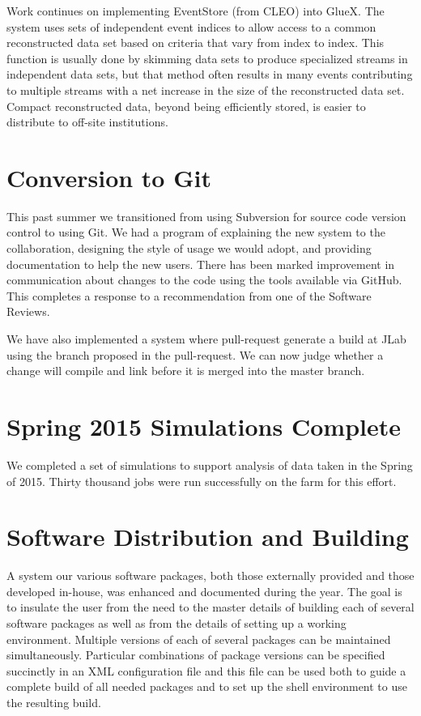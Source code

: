\documentclass[12pt]{article}
\begin{document}
Work continues on implementing EventStore (from CLEO) into GlueX.
The system uses sets of independent event indices to
allow access to a common reconstructed data set based on criteria that
vary from index to index. This function is usually done by skimming
data sets to produce specialized streams in independent data sets, but
that method often results in many events contributing to multiple
streams with a net increase in the size of the reconstructed data
set. Compact reconstructed data, beyond being efficiently stored, is
easier to distribute to off-site institutions.

\section{Conversion to Git}

This past summer we transitioned from using Subversion for source code
version control to using Git. We had a program of explaining the new
system to the collaboration, designing the style of usage we would
adopt, and providing documentation to help the new users. There has
been marked improvement in communication about changes to the code
using the tools available via GitHub\cite{gluex-github}.
This completes a response to a
recommendation from one of the Software Reviews.

We have also implemented a system where pull-request generate a build
at JLab using the branch proposed in the pull-request. We can now
judge whether a change will compile and link before it is merged into
the master branch.

\section{Spring 2015 Simulations Complete}

We completed a set of simulations to support analysis of data taken in
the Spring of 2015. Thirty thousand jobs were run successfully on the
farm for this effort.

\section{Software Distribution and Building}

A system our various software packages, both those externally provided
and those developed in-house, was enhanced and documented during the
year. The goal is to insulate the user from the need to the master
details of building each of several software packages as well as from
the details of setting up a working environment. Multiple versions of
each of several packages can be maintained simultaneously. Particular
combinations of package versions can be specified succinctly in an XML
configuration file and this file can be used both to guide a complete
build of all needed packages and to set up the shell environment to
use the resulting build.
\end{document}
